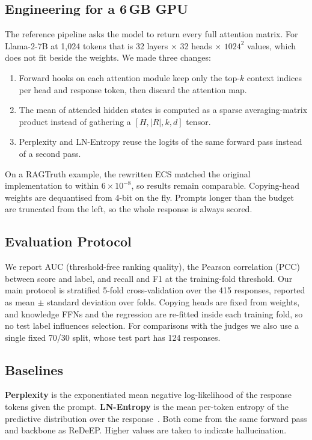 \documentclass[conference]{IEEEtran}
\begin{document}
\subsection{Engineering for a 6\,GB GPU}
The reference pipeline asks the model to return every full attention matrix. For Llama-2-7B at 1{,}024 tokens that is 32 layers $\times$ 32 heads $\times$ $1024^2$ values, which does not fit beside the weights. We made three changes:
\begin{enumerate}
\item Forward hooks on each attention module keep only the top-$k$ context indices per head and response token, then discard the attention map.
\item The mean of attended hidden states is computed as a sparse averaging-matrix product instead of gathering a $[H, |R|, k, d]$ tensor.
\item Perplexity and LN-Entropy reuse the logits of the same forward pass instead of a second pass.
\end{enumerate}
On a RAGTruth example, the rewritten ECS matched the original implementation to within $6\times10^{-8}$, so results remain comparable. Copying-head weights are dequantised from 4-bit on the fly. Prompts longer than the budget are truncated from the left, so the whole response is always scored.

\subsection{Evaluation Protocol}
We report AUC (threshold-free ranking quality), the Pearson correlation (PCC) between score and label, and recall and F1 at the training-fold threshold. Our main protocol is stratified 5-fold cross-validation over the 415 responses, reported as mean $\pm$ standard deviation over folds. Copying heads are fixed from weights, and knowledge FFNs and the regression are re-fitted inside each training fold, so no test label influences selection. For comparisons with the judges we also use a single fixed 70/30 split, whose test part has 124 responses.

\subsection{Baselines}
\textbf{Perplexity} is the exponentiated mean negative log-likelihood of the response tokens given the prompt. \textbf{LN-Entropy} is the mean per-token entropy of the predictive distribution over the response~\cite{malinin2021uncertainty}. Both come from the same forward pass and backbone as ReDeEP. Higher values are taken to indicate hallucination.
\end{document}
